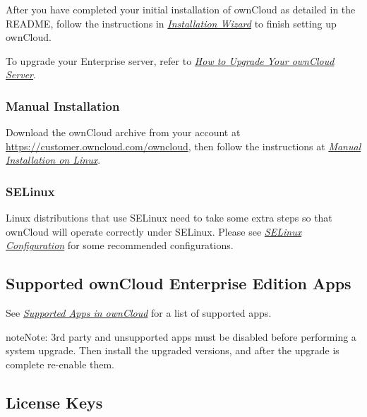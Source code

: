 \documentclass[letterpaper,10pt,english]{sphinxmanual}
\begin{document}
After you have completed your initial installation of ownCloud as detailed in
the README, follow the instructions in
{\hyperref[installation/installation_wizard::doc]{\emph{Installation Wizard}}} to finish setting up ownCloud.

To upgrade your Enterprise server, refer to
{\hyperref[maintenance/upgrade::doc]{\emph{How to Upgrade Your ownCloud Server}}}.


\subsubsection{Manual Installation}
\label{enterprise_installation/linux_installation:manual-installation}
Download the ownCloud archive from your account at \href{https://customer.owncloud.com/owncloud}{https://customer.owncloud.com/owncloud}, then follow the instructions at {\hyperref[installation/source_installation::doc]{\emph{Manual Installation on Linux}}}.


\subsubsection{SELinux}
\label{enterprise_installation/linux_installation:selinux}
Linux distributions that use SELinux need to take some extra steps so that
ownCloud will operate correctly under SELinux. Please see
{\hyperref[installation/selinux_configuration::doc]{\emph{SELinux Configuration}}} for some recommended configurations.


\subsection{Supported ownCloud Enterprise Edition Apps}
\label{enterprise_installation/supported_apps_installation:supported-owncloud-enterprise-edition-apps}\label{enterprise_installation/supported_apps_installation::doc}
See {\hyperref[installation/apps_supported::doc]{\emph{Supported Apps in ownCloud}}} for a list of supported apps.

\begin{notice}{note}{Note:}
3rd party and unsupported apps must be disabled before performing a
system upgrade. Then install the upgraded versions, and after the
upgrade is complete re-enable them.
\end{notice}


\subsection{License Keys}
\label{enterprise_installation/license_keys_installation::doc}\label{enterprise_installation/license_keys_installation:license-keys}
\end{document}
